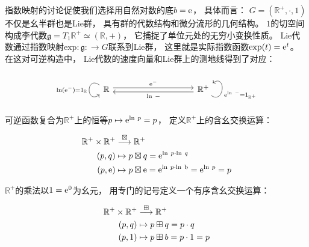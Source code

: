 ﻿\documentclass[10pt,a4paper]{article}
\numberwithin{equation}{section}
\begin{document}
指数映射的讨论促使我们选择用自然对数的底$b = \text e$，
具体而言：
$G = (\mathbb R^+,\cdot,1)$不仅是幺半群也是Lie群，
具有群的代数结构和微分流形的几何结构。
$1$的切空间构成李代数$\mathfrak g = T_1 \mathbb R^+ \simeq (\mathbb R,+)$，
它捕捉了单位元处的无穷小变换性质。
Lie代数通过指数映射$\text{exp}: \mathfrak g: \to G$联系到Lie群，
这里就是实际指数函数$\text{exp}(t) = \text e^t$。
在这对可逆构造中，
Lie代数的速度向量和Lie群上的测地线得到了对应：

\begin{equation}
\begin{tikzcd}
\mathbb R \arrow[rrrr, "\text e^-", shift left] \arrow["\text{ln}(\text e^-) = 1_\mathbb R"', loop, distance=2em, in=215, out=145] &  &  &  & \mathbb R^+ \arrow[llll, "\text{ln} \ -", shift left] \arrow["\text e^{\text{ln} \ -} = 1_{\mathbb R^+}"', loop, distance=2em, in=35, out=325]
\end{tikzcd}
\label{eq:Lie-group-algebra}
\end{equation}

可逆函数复合为$\mathbb R^+$上的恒等$p \mapsto \text e^{\text{ln} \ p} = p$，
定义$\mathbb R^+$上的含幺交换运算：

$$
\begin{aligned}
\mathbb R^+ \times \mathbb R^+ &\stackrel{\mathbin{\boxtimes}}{\longrightarrow} \mathbb R^+ \\    
(p,q) &\mapsto p \mathbin{\boxtimes} q = \text e^{\text{ln} \ p \cdot \text{ln} \ q} \\
(p,\text e) &\mapsto p \mathbin{\boxtimes} \text e = \text e^{\text{ln} \ p \cdot \text{ln} \ \text b} = \text e^{\text{ln} \ p} = p \\
\end{aligned}
$$

$\mathbb R^+$的乘法以$1 = \text e^0$为幺元，
用专门的记号定义一个有序含幺交换运算：

$$
\begin{aligned}
\mathbb R^+ \times \mathbb R^+ &\stackrel{\mathbin{\boxplus}}{\longrightarrow} \mathbb R^+ \\    
(p,q) &\mapsto p \mathbin{\boxplus} q = p \cdot q \\
(p,1) &\mapsto p \mathbin{\boxplus} b = p \cdot 1 = p \\
\end{aligned}
$$
\end{document}
